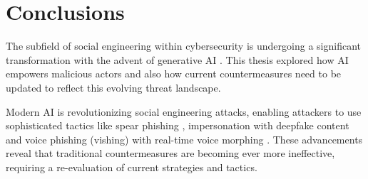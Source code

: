 


\chapter{Conclusions\label{chapter:conclusions}}
\begin{comment}

Guides:
    - 2 pages
    - No subsections

TODO:
    [ ] How AI has augmented SE attacks and countermeasures
    [ ] Gap in the literature

What to cover:
    - How AI has augmented SE attacks and countermeasures
    - Gap in the literature regarding SE and AI intersection?
    - Analysis on where AI-powered SE attacks might be headed in the future
        - Also about robotics and human-like actors
    - What organizations and individuals need to do regarding the evolving landscape of SE attacks

Speculation:
    - Drones dropping USB thumbdrives?
    - Human-like android as threat actors
    - Impact of robotics on dumpster diving, shoulder surfing and baiting
    
From training material:
    - "Yhteenveto vaatimattomimmillaan on vain lyhyt kertaus kirjoituksen keskeisistä asioista. Arvokkaamman yhteenvedon saa aikaan kommentoimalla työn tulosten arvoa, työn liittymistä ympäristöön ja tulevaisuudennäkymiä. Tällaiset arviot huolellisesti perusteltava."
    - "Yhteenvetoluku kuvaa teknisten johtopäätösten tuomaa impaktia."

\end{comment}

The subfield of social engineering within cybersecurity is undergoing a significant transformation with the advent of generative AI \citep{fakhouriAIDrivenSolutionsForSocialEngineeringAttacks2024}. This thesis explored how AI empowers malicious actors and also how current countermeasures need to be updated to reflect this evolving threat landscape.

Modern AI is revolutionizing social engineering attacks, enabling attackers to use sophisticated tactics like spear phishing \citep{basitComprehensiveSurveyAIenabledPhishingAttacks2021}, impersonation with deepfake content \citep{mirskyTheCreationAndDetectionOfDeepfakes2021} and voice phishing (vishing) with real-time voice morphing \citep{doanBTSEAudioDeepfakeDetectiong2023}. These advancements reveal that traditional countermeasures are becoming ever more ineffective, requiring a re-evaluation of current strategies and tactics.

